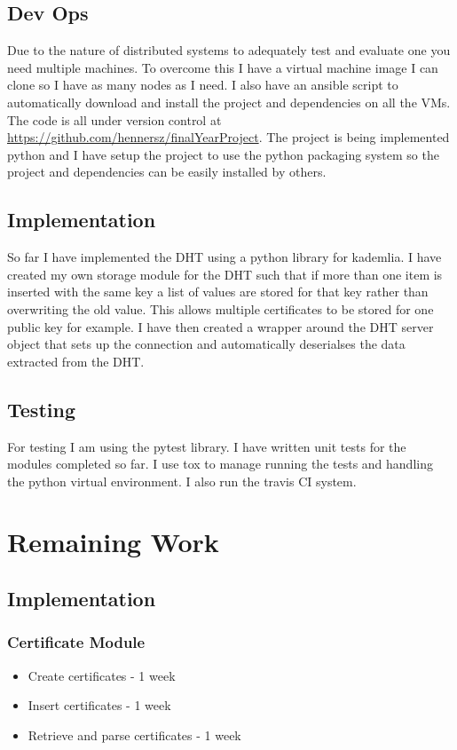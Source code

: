 \documentclass[10pt, a4paper]{article}
\begin{document}
\subsection{Dev Ops}
Due to the nature of distributed systems to adequately test and evaluate one you need multiple machines. To overcome this I have a virtual machine image I can clone so I have as many nodes as I need. I also have an ansible script to automatically download and install the project and dependencies on all the VMs. The code is all under version control at \url{https://github.com/hennersz/finalYearProject}. The project is being implemented python and I have setup the project to use the python packaging system so the project and dependencies can be easily installed by others.
\subsection{Implementation}
So far I have implemented the DHT using a python library for kademlia. I have created my own storage module for the DHT such that if more than one item is inserted with the same key a list of values are stored for that key rather than overwriting the old value. This allows multiple certificates to be stored for one public key for example. I have then created a wrapper around the DHT server object that sets up the connection and automatically deserialses the data extracted from the DHT. 
\subsection{Testing}
For testing I am using the pytest library. I have written unit tests for the modules completed so far. I use tox to manage running the tests and handling the python virtual environment. I also run the travis CI system.
\section{Remaining Work}
\subsection{Implementation}
\subsubsection{Certificate Module}
\begin{itemize}[noitemsep]
  \item Create certificates - 1 week
  \item Insert certificates - 1 week
  \item Retrieve and parse certificates - 1 week
\end{itemize}
\end{document}
